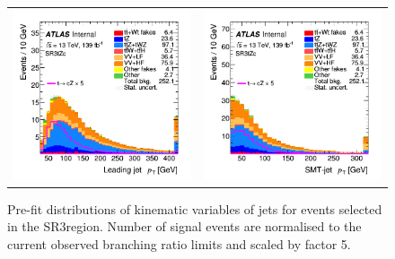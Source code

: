 \begin{figure}[htbp]
\begin{tabular}{cc}
		\includegraphics[width=.45\textwidth]{Chapters/CH6/figures/SR3_UsingSMT/jet_pt} &
		\includegraphics[width=.45\textwidth]{Chapters/CH6/figures/SR3_UsingSMT/SMTjet_Pt} \\
	\end{tabular}
	\caption{Pre-fit distributions of kinematic variables of jets for events selected in the SR3\tZc region. Number of signal events are normalised to the current observed branching ratio limits and scaled by factor 5. 
		\ErrStatOnly
		\Blinded
	}%
	\label{fig:sr3_kin_jet}
\end{figure}
\newpage
